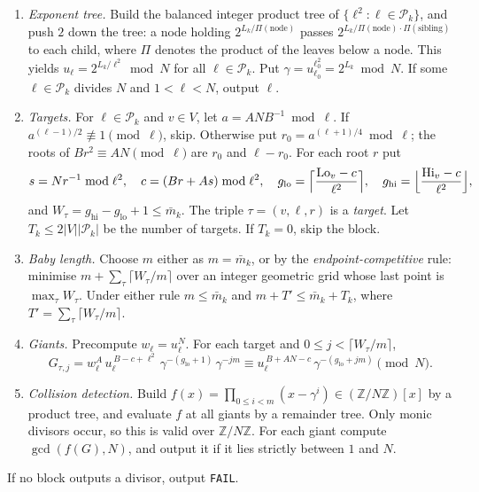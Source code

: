 \documentclass[11pt]{amsart}
\theoremstyle{definition}
\newcommand{\Z}{\mathbb{Z}}
\newcommand{\Pk}{\mathcal{P}_k}
\newcommand{\mbar}{\bar m_k}
\begin{document}
\begin{enumerate}[label=\arabic*.,resume]
\item \emph{Exponent tree.} Build the balanced integer product tree of
  $\{\ell^2:\ell\in\Pk\}$, and push $2$ down the tree: a node holding $2^{L_k/\Pi(\text{node})}$
  passes $2^{L_k/\Pi(\text{node})\cdot\Pi(\text{sibling})}$ to each child, where $\Pi$ denotes
  the product of the leaves below a node. This yields $u_\ell=2^{L_k/\ell^2}\bmod N$ for all
  $\ell\in\Pk$. Put $\gamma=u_{\ell_0}^{\ell_0^2}=2^{L_k}\bmod N$. If some $\ell\in\Pk$ divides
  $N$ and $1<\ell<N$, output $\ell$.
\item \emph{Targets.} For $\ell\in\Pk$ and $v\in V$, let $a=ANB^{-1}\bmod\ell$. If
  $a^{(\ell-1)/2}\not\equiv1\pmod\ell$, skip. Otherwise put $r_0=a^{(\ell+1)/4}\bmod\ell$; the
  roots of $Br^2\equiv AN\pmod\ell$ are $r_0$ and $\ell-r_0$. For each root $r$ put
  \[
    s=Nr^{-1}\bmod\ell^2,\quad c=(Br+As)\bmod\ell^2,\quad
    g_{\mathrm{lo}}=\Bigl\lceil\frac{\mathrm{Lo}_v-c}{\ell^2}\Bigr\rceil,\quad
    g_{\mathrm{hi}}=\Bigl\lfloor\frac{\mathrm{Hi}_v-c}{\ell^2}\Bigr\rfloor,
  \]
  and $W_\tau=g_{\mathrm{hi}}-g_{\mathrm{lo}}+1\le\mbar$. The triple $\tau=(v,\ell,r)$ is a
  \emph{target}. Let $T_k\le2|V||\Pk|$ be the number of targets. If $T_k=0$, skip the block.
\item \emph{Baby length.} Choose $m$ either as $m=\mbar$, or by the \emph{endpoint-competitive}
  rule: minimise $m+\sum_\tau\lceil W_\tau/m\rceil$ over an integer geometric grid whose last
  point is $\max_\tau W_\tau$. Under either rule $m\le\mbar$ and $m+T'\le\mbar+T_k$, where
  $T'=\sum_\tau\lceil W_\tau/m\rceil$.
\item \emph{Giants.} Precompute $w_\ell=u_\ell^N$. For each target and
  $0\le j<\lceil W_\tau/m\rceil$,
  \[
    G_{\tau,j}=w_\ell^{A}\,u_\ell^{\,B-c+\ell^2}\,\gamma^{-(g_{\mathrm{lo}}+1)}\,\gamma^{-jm}
    \equiv u_\ell^{\,B+AN-c}\,\gamma^{-(g_{\mathrm{lo}}+jm)}\pmod N.
  \]
\item \emph{Collision detection.} Build $f(x)=\prod_{0\le i<m}(x-\gamma^i)\in(\Z/N\Z)[x]$ by a
  product tree, and evaluate $f$ at all giants by a remainder tree. Only monic divisors occur, so
  this is valid over $\Z/N\Z$. For each giant compute $\gcd(f(G),N)$, and output it if it lies
  strictly between $1$ and $N$.
\end{enumerate}
If no block outputs a divisor, output \texttt{FAIL}.
\end{document}
